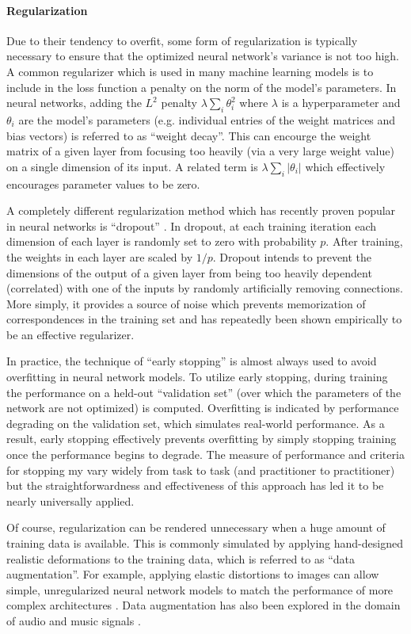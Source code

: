 \paragraph{Regularization}

Due to their tendency to overfit, some form of regularization is typically necessary to ensure that the optimized neural network's variance is not too high.
A common regularizer which is used in many machine learning models is to include in the loss function a penalty on the norm of the model's parameters.
In neural networks, adding the $L^2$ penalty $\lambda \sum_i \theta_i^2$ where $\lambda$ is a hyperparameter and $\theta_i$ are the model's parameters (e.g. individual entries of the weight matrices and bias vectors) is referred to as ``weight decay''.
This can encourge the weight matrix of a given layer from focusing too heavily (via a very large weight value) on a single dimension of its input.
A related term is $\lambda \sum_i |\theta_i|$ which effectively encourages parameter values to be zero.

A completely different regularization method which has recently proven popular in neural networks is ``dropout'' \cite{}.
In dropout, at each training iteration each dimension of each layer is randomly set to zero with probability $p$.
After training, the weights in each layer are scaled by $1/p$.
Dropout intends to prevent the dimensions of the output of a given layer from being too heavily dependent (correlated) with one of the inputs by randomly artificially removing connections.
More simply, it provides a source of noise which prevents memorization of correspondences in the training set and has repeatedly been shown empirically to be an effective regularizer.

In practice, the technique of ``early stopping'' is almost always used to avoid overfitting in neural network models.
To utilize early stopping, during training the performance on a held-out ``validation set'' (over which the parameters of the network are not optimized) is computed.
Overfitting is indicated by performance degrading on the validation set, which simulates real-world performance.
As a result, early stopping effectively prevents overfitting by simply stopping training once the performance begins to degrade.
The measure of performance and criteria for stopping my vary widely from task to task (and practitioner to practitioner) but the straightforwardness and effectiveness of this approach has led it to be nearly universally applied.

Of course, regularization can be rendered unnecessary when a huge amount of training data is available.
This is commonly simulated by applying hand-designed realistic deformations to the training data, which is referred to as ``data augmentation''.
For example, applying elastic distortions to images can allow simple, unregularized neural network models to match the performance of more complex architectures \cite{}.
Data augmentation has also been explored in the domain of audio and music signals \cite{}.

